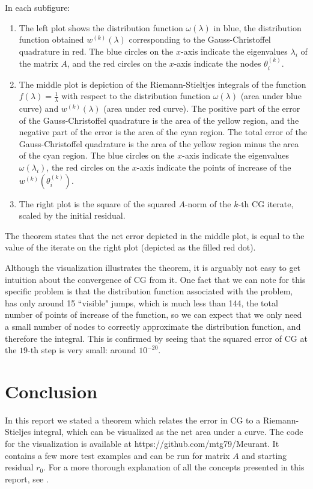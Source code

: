 \documentclass[10pt,a4paper]{article}
\begin{document}
In each subfigure:
\begin{enumerate}
\item The left plot shows the distribution function $\omega(\lambda)$ in blue, the distribution function obtained  $w^{(k)}(\lambda)$ corresponding to the Gauss-Christoffel quadrature in red. The blue circles on the $x$-axis indicate the eigenvalues $\lambda_i$ of the matrix $A$, and the red circles on the $x$-axis indicate the nodes $\theta_i^{(k)}$.
\item The middle plot is depiction of the Riemann-Stieltjes integrals of the function $f(\lambda) = \frac{1}{\lambda} $ with respect to the distribution function $\omega(\lambda)$ (area under blue curve) and $w^{(k)}(\lambda)$ (area under red curve). The positive part of the error of the Gauss-Christoffel quadrature is the area of the yellow region, and the negative part of the error is the area of the cyan region. The total error of the Gauss-Christoffel quadrature is the area of the yellow region minus the area of the cyan region. The blue circles on the $x$-axis indicate the eigenvalues $\omega(\lambda_i)$, the red circles on the $x$-axis indicate the points of increase of the $w^{(k)}(\theta_i^{(k)})$.
\item The right plot is the square of the squared $A$-norm of the $k$-th CG iterate, scaled by the initial residual.
\end{enumerate}
The theorem states that the net error depicted in the middle plot, is equal to the value of the iterate on the right plot (depicted as the filled red dot). 

Although the visualization illustrates the theorem, it is arguably not easy to get intuition about the convergence of CG from it. One fact that we can note for this specific problem is that the distribution function associated with the problem, has only around 15 ``visible" jumps, which is much less than 144, the total number of points of increase of the function, so we can expect that we only need a small number of nodes to correctly approximate the distribution function, and therefore the integral. This is confirmed by seeing that the squared error of CG at the $19$-th step is very small: around $10^{-20} $. 



\section{Conclusion}

In this report we stated a theorem which relates the error in CG to a Riemann-Stieljes integral, which can be visualized as the net area under a curve. The code for the visualization is available at https://github.com/mtg79/Meurant. It contains a few more test examples and can be run for matrix $A$ and starting residual $r_0$. For a more thorough explanation of all the concepts presented in this report, see \cite{liesen_strakoss_zdenek_2013}.

\printbibliography
\end{document}
